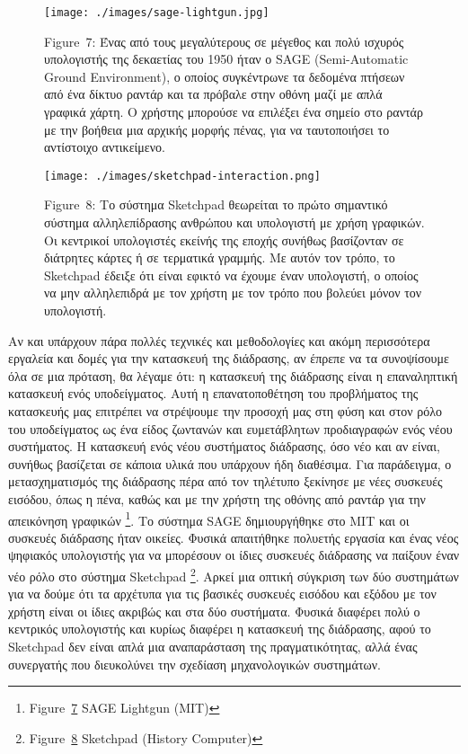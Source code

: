 \documentclass[
]{article}
\begin{document}
\leavevmode{}%
\begin{figure}
\hypertarget{fig:sage-lightgun}{%
\centering
\texttt{[image: ./images/sage-lightgun.jpg]}
\caption{Figure~7: Ένας από τους μεγαλύτερους σε μέγεθος και πολύ
ισχυρός υπολογιστής της δεκαετίας του 1950 ήταν ο SAGE (Semi-Automatic
Ground Environment), ο οποίος συγκέντρωνε τα δεδομένα πτήσεων από ένα
δίκτυο ραντάρ και τα πρόβαλε στην οθόνη μαζί με απλά γραφικά χάρτη. Ο
χρήστης μπορούσε να επιλέξει ένα σημείο στο ραντάρ με την βοήθεια μια
αρχικής μορφής πένας, για να ταυτοποιήσει το αντίστοιχο
αντικείμενο.}\label{fig:sage-lightgun}
}
\end{figure}

\leavevmode{}%
\begin{figure}
\hypertarget{fig:sketchpad-interaction}{%
\centering
\texttt{[image: ./images/sketchpad-interaction.png]}
\caption{Figure~8: Το σύστημα Sketchpad θεωρείται το πρώτο σημαντικό
σύστημα αλληλεπίδρασης ανθρώπου και υπολογιστή με χρήση γραφικών. Οι
κεντρικοί υπολογιστές εκείνής της εποχής συνήθως βασίζονταν σε διάτρητες
κάρτες ή σε τερματικά γραμμής. Με αυτόν τον τρόπο, το Sketchpad έδειξε
ότι είναι εφικτό να έχουμε έναν υπολογιστή, ο οποίος να μην αλληλεπιδρά
με τον χρήστη με τον τρόπο που βολεύει μόνον τον
υπολογιστή.}\label{fig:sketchpad-interaction}
}
\end{figure}

Αν και υπάρχουν πάρα πολλές τεχνικές και μεθοδολογίες και ακόμη
περισσότερα εργαλεία και δομές για την κατασκευή της διάδρασης, αν
έπρεπε να τα συνοψίσουμε όλα σε μια πρόταση, θα λέγαμε ότι: η κατασκευή
της διάδρασης είναι η επαναληπτική κατασκευή ενός υποδείγματος. Αυτή η
επανατοποθέτηση του προβλήματος της κατασκευής μας επιτρέπει να
στρέψουμε την προσοχή μας στη φύση και στον ρόλο του υποδείγματος ως ένα
είδος ζωντανών και ευμετάβλητων προδιαγραφών ενός νέου συστήματος. Η
κατασκευή ενός νέου συστήματος διάδρασης, όσο νέο και αν είναι, συνήθως
βασίζεται σε κάποια υλικά που υπάρχουν ήδη διαθέσιμα. Για παράδειγμα, ο
μετασχηματισμός της διάδρασης πέρα από τον τηλέτυπο ξεκίνησε με νέες
συσκευές εισόδου, όπως η πένα, καθώς και με την χρήστη της οθόνης από
ραντάρ για την απεικόνηση γραφικών \footnote{Figure~\protect\hyperlink{fig:sage-lightgun}{7}
  SAGE Lightgun (MIT)}. Το σύστημα SAGE δημιουργήθηκε στο MIT και οι
συσκευές διάδρασης ήταν οικείες. Φυσικά απαιτήθηκε πολυετής εργασία και
ένας νέος ψηφιακός υπολογιστής για να μπορέσουν οι ίδιες συσκευές
διάδρασης να παίξουν έναν νέο ρόλο στο σύστημα Sketchpad \footnote{Figure~\protect\hyperlink{fig:sketchpad-interaction}{8}
  Sketchpad (History Computer)}. Αρκεί μια οπτική σύγκριση των δύο
συστημάτων για να δούμε ότι τα αρχέτυπα για τις βασικές συσκευές εισόδου
και εξόδου με τον χρήστη είναι οι ίδιες ακριβώς και στα δύο συστήματα.
Φυσικά διαφέρει πολύ ο κεντρικός υπολογιστής και κυρίως διαφέρει η
κατασκευή της διάδρασης, αφού το Sketchpad δεν είναι απλά μια
αναπαράσταση της πραγματικότητας, αλλά ένας συνεργατής που διευκολύνει
την σχεδίαση μηχανολογικών συστημάτων.
\end{document}
